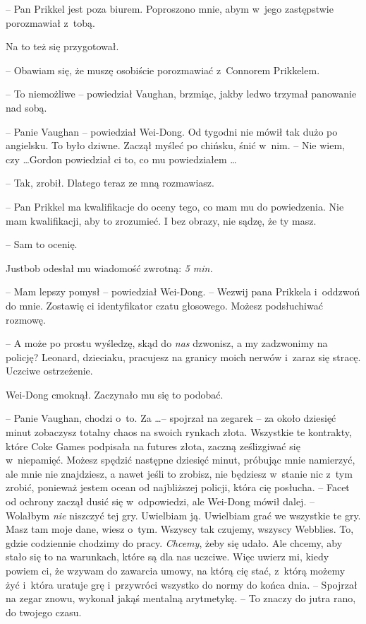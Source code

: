 \documentclass[oneside,polish,11pt,rmheadings]{mwbk}
\begin{document}
-- Pan Prikkel jest poza biurem. Poproszono mnie, abym w~jego zastępstwie porozmawiał z~tobą.

Na to też się przygotował. 

-- Obawiam się, że muszę osobiście porozmawiać z~Connorem Prikkelem.

-- To niemożliwe -- powiedział Vaughan, brzmiąc, jakby ledwo trzymał panowanie nad sobą.

-- Panie Vaughan -- powiedział Wei-Dong. Od tygodni nie mówił tak dużo po angielsku. To było dziwne. Zaczął myśleć po chińsku, śnić w~nim. -- Nie wiem, czy \ldots  Gordon powiedział ci to, co mu powiedziałem \ldots 

-- Tak, zrobił. Dlatego teraz ze mną rozmawiasz.

-- Pan Prikkel ma kwalifikacje do oceny tego, co mam mu do powiedzenia. Nie mam kwalifikacji, aby to zrozumieć. I bez obrazy, nie sądzę, że ty masz.

-- Sam to ocenię.

Justbob odesłał mu wiadomość zwrotną: \textit{5 min.}

-- Mam lepszy pomysł -- powiedział Wei-Dong. -- Wezwij pana Prikkela i~oddzwoń do mnie. Zostawię ci identyfikator czatu głosowego. Możesz podsłuchiwać rozmowę.

-- A może po prostu wyśledzę, skąd do \textit{nas }dzwonisz, a my zadzwonimy na policję? Leonard, dzieciaku, pracujesz na granicy moich nerwów i~zaraz się stracę. Uczciwe ostrzeżenie.

Wei-Dong cmoknął. Zaczynało mu się to podobać. 

-- Panie Vaughan, chodzi o~to. Za \ldots  -- spojrzał na zegarek -- za około dziesięć minut zobaczysz totalny chaos na swoich rynkach złota. Wszystkie te kontrakty, które Coke Games podpisała na futures złota, zaczną ześlizgiwać się w~niepamięć. Możesz spędzić następne dziesięć minut, próbując mnie namierzyć, ale mnie nie znajdziesz, a nawet jeśli to zrobisz, nie będziesz w~stanie nic z~tym zrobić, ponieważ jestem ocean od najbliższej policji, która cię posłucha. -- Facet od ochrony zaczął dusić się w~odpowiedzi, ale Wei-Dong mówił dalej. -- Wolałbym \textit{nie }niszczyć tej gry. Uwielbiam ją. Uwielbiam grać we wszystkie te gry. Masz tam moje dane, wiesz o~tym. Wszyscy tak czujemy, wszyscy Webblies. To, gdzie codziennie chodzimy do pracy. \textit{Chcemy}, żeby się udało. Ale chcemy, aby stało się to na warunkach, które są dla nas uczciwe. Więc uwierz mi, kiedy powiem ci, że wzywam do zawarcia umowy, na którą cię stać, z~którą możemy żyć i~która uratuje grę i~przywróci wszystko do normy do końca dnia. -- Spojrzał na zegar znowu, wykonał jakąś mentalną arytmetykę. -- To znaczy do jutra rano, do twojego czasu.
\end{document}
